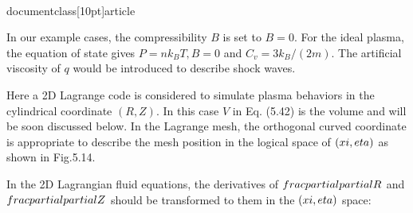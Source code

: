 \\documentclass[10pt]{article}
\begin{document}
{In our example cases, the compressibility $B$ is set to $B=0$. For the ideal plasma, the equation of state gives $P=n k_{B} T, B=0$ and $C_{v}=3 k_{B} /(2 m)$. The artificial viscosity of $q$ would be introduced to describe shock waves.

Here a 2D Lagrange code is considered to simulate plasma behaviors in the cylindrical coordinate $(R, Z)$. In this case $V$ in Eq. (5.42) is the volume and will be soon discussed below. In the Lagrange mesh, the orthogonal curved coordinate is appropriate to describe the mesh position in the logical space of $(\\xi, \\eta)$ as shown in Fig.5.14.

In the 2D Lagrangian fluid equations, the derivatives of $\\frac{\\partial}{\\partial R}$ and $\\frac{\\partial}{\\partial Z}$ should be transformed to them in the $(\\xi, \\eta)$ space:


}
\end{document}
